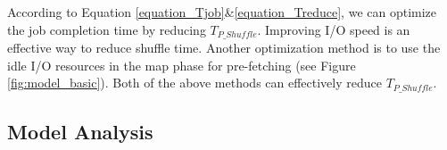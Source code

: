 {According to Equation \ref{equation_Tjob}\&\ref{equation_Treduce}, we can optimize the job completion time by reducing \(T_{P\_Shuffle}\). Improving I/O speed is an effective way to reduce shuffle time. Another optimization method is to use the idle I/O resources in the map phase for pre-fetching (see Figure \ref{fig:model_basic}). Both of the above methods can effectively reduce \(T_{P\_Shuffle}\). 

\subsection{Model Analysis}\label{model_analysis}




}
